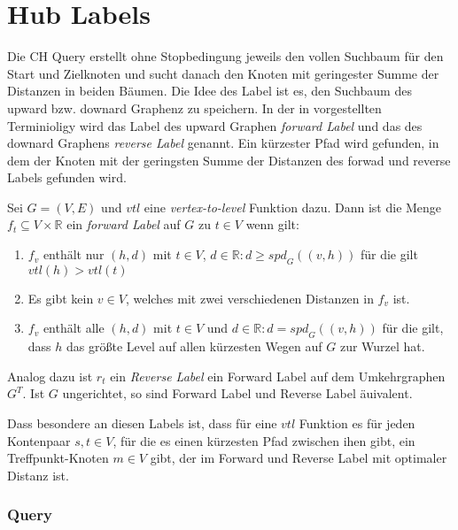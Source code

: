 \chapter{Hub Labels}\label{chapter:hl}

Die CH Query erstellt ohne Stopbedingung jeweils den vollen Suchbaum für den Start und Zielknoten und sucht danach den Knoten mit geringester Summe der Distanzen in beiden Bäumen.
Die Idee des Label ist es, den Suchbaum des upward bzw. downard Graphenz zu speichern.
In der in \cite{abraham2011hub} vorgestellten Terminioligy wird das Label des upward Graphen \emph{forward Label} und das des downard Graphens \emph{reverse Label} genannt.
Ein kürzester Pfad wird gefunden, in dem der Knoten mit der geringsten Summe der Distanzen des forwad und reverse Labels gefunden wird.

\begin{definition}
    Sei $G = (V, E)$ und ${vtl}$ eine \emph{vertex-to-level} Funktion dazu. Dann ist die Menge $f_t \subseteq V \times \mathbb{R}$ ein \emph{forward Label} auf $G$ zu $t \in V$ wenn gilt:

    \begin{enumerate}
        \item
              $f_v$ enthält nur $(h, d)$ mit $t \in V$, $d \in \mathbb{R} \colon d \geq {spd}_G ((v, h))$ für die gilt ${vtl}(h) > {vtl}(t)$

        \item
              Es gibt kein $v \in V$, welches mit zwei verschiedenen Distanzen in $f_v$ ist.

        \item
              $f_v$ enthält alle $(h, d)$ mit $t \in V$ und $d \in \mathbb{R} \colon d = {spd}_G ((v, h))$ für die gilt, dass $h$ das größte Level auf allen kürzesten Wegen auf $G$ zur Wurzel hat.
    \end{enumerate}

    Analog dazu ist $r_t$ ein \emph{Reverse Label} ein Forward Label auf dem Umkehrgraphen $G^T$. Ist $G$ ungerichtet, so sind Forward Label und Reverse Label äuivalent.
\end{definition}

Dass besondere an diesen Labels ist, dass für eine ${vtl}$ Funktion es für jeden Kontenpaar $s, t \in V$, für die es einen kürzesten Pfad zwischen ihen gibt, ein Treffpunkt-Knoten $m \in V$ gibt, der im Forward und Reverse Label mit optimaler Distanz ist.

\subsection{Query}


